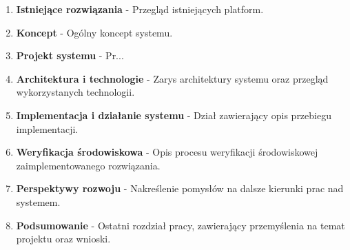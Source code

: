 \begin{enumerate}

\item \textbf{Istniejące rozwiązania} - Przegląd istniejących platform. \\

\item \textbf{Koncept} - Ogólny koncept systemu. \\

\item \textbf{Projekt systemu} - Pr... \\

\item \textbf{Architektura i technologie} - Zarys architektury systemu oraz przegląd wykorzystanych technologii.  \\

\item \textbf{Implementacja i działanie systemu} - Dział zawierający opis przebiegu implementacji.  \\

\item \textbf{Weryfikacja środowiskowa} - Opis procesu weryfikacji środowiskowej zaimplementowanego rozwiązania.  \\

\item \textbf{Perspektywy rozwoju} - Nakreślenie pomysłów na dalsze kierunki prac nad systemem.  \\

\item \textbf{Podsumowanie} - Ostatni rozdział pracy, zawierający przemyślenia na temat projektu oraz wnioski.  \\

\end{enumerate}


